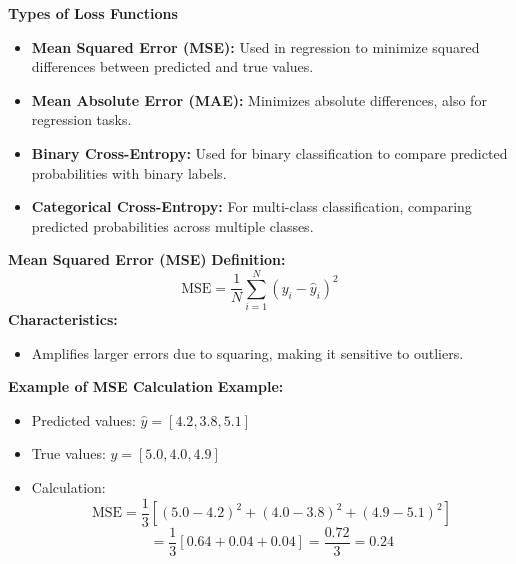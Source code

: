 \documentclass[serif, aspectratio=169]{beamer}
\begin{document}




\begin{frame}{\textbf{Types of Loss Functions}}
    \begin{itemize}
        \item \textbf{Mean Squared Error (MSE):} Used in regression to minimize squared differences between predicted and true values.
        \item \textbf{Mean Absolute Error (MAE):} Minimizes absolute differences, also for regression tasks.
        \item \textbf{Binary Cross-Entropy:} Used for binary classification to compare predicted probabilities with binary labels.
        \item \textbf{Categorical Cross-Entropy:} For multi-class classification, comparing predicted probabilities across multiple classes.
    \end{itemize}
\end{frame}

\begin{frame}{\textbf{Mean Squared Error (MSE)}}
    \textbf{Definition:}
    \[
    \text{MSE} = \frac{1}{N} \sum_{i=1}^{N} \left( y_i - \hat{y}_i \right)^2
    \]
    \textbf{Characteristics:}
    \begin{itemize}
        \item Amplifies larger errors due to squaring, making it sensitive to outliers.
    \end{itemize}
\end{frame}

\begin{frame}{\textbf{Example of MSE Calculation}}
    \textbf{Example:}
    \begin{itemize}
        \item Predicted values: \( \hat{y} = [4.2, 3.8, 5.1] \)
        \item True values: \( y = [5.0, 4.0, 4.9] \)
        \item Calculation:
        \[
        \text{MSE} = \frac{1}{3} \left[ (5.0 - 4.2)^2 + (4.0 - 3.8)^2 + (4.9 - 5.1)^2 \right]
        \]
        \[
        = \frac{1}{3} \left[ 0.64 + 0.04 + 0.04 \right] = \frac{0.72}{3} = 0.24
        \]
    \end{itemize}
\end{frame}
\end{document}
